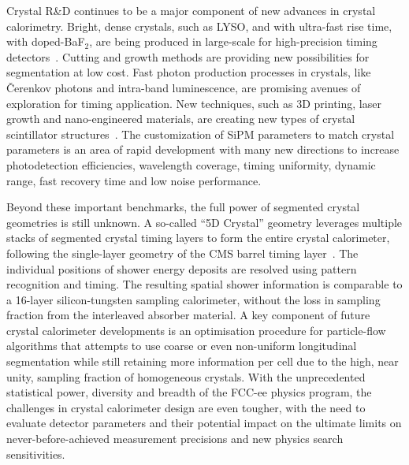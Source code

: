 Crystal R\&D continues to be a major component of new advances in crystal calorimetry.  Bright, dense crystals, such as LYSO, and with ultra-fast rise time, with doped-BaF$_2$, are being produced in large-scale for high-precision timing detectors~\cite{Kratochwil_2020,OMELKOV2018260}.  Cutting and growth methods are providing new possibilities for segmentation at low cost.  Fast photon production processes in crystals, like \v{C}erenkov photons and intra-band luminescence, are promising avenues of exploration for timing application.  New techniques, such as 3D printing, laser growth and nano-engineered materials, are creating new types of crystal scintillator structures~\cite{TURTOS2019116613}.  The customization of SiPM parameters to match crystal parameters is an area of rapid development with many new directions to increase photodetection efficiencies, wavelength coverage, timing uniformity, dynamic range, fast recovery time and low noise performance.


Beyond these important benchmarks, the full power of segmented crystal geometries is still unknown.  A so-called ``5D Crystal'' geometry leverages multiple stacks of segmented crystal timing layers to form the entire crystal calorimeter, following the single-layer geometry of the CMS barrel timing layer~\cite{CERN-LHCC-2017-027}.  The individual positions of shower energy deposits are resolved using pattern recognition and timing.  The resulting spatial shower information is comparable to a 16-layer silicon-tungsten sampling calorimeter, without the loss in sampling fraction from the interleaved absorber material.  A key component of future crystal calorimeter developments is an optimisation procedure for particle-flow algorithms that attempts to use coarse or even non-uniform longitudinal segmentation while still retaining more information per cell due to the high, near unity, sampling fraction of homogeneous crystals.  With the unprecedented statistical power, diversity and breadth of the FCC-ee physics program, the challenges in crystal calorimeter design are even tougher, with the need to evaluate detector parameters and their potential impact on the ultimate limits on never-before-achieved measurement precisions and new physics search sensitivities.